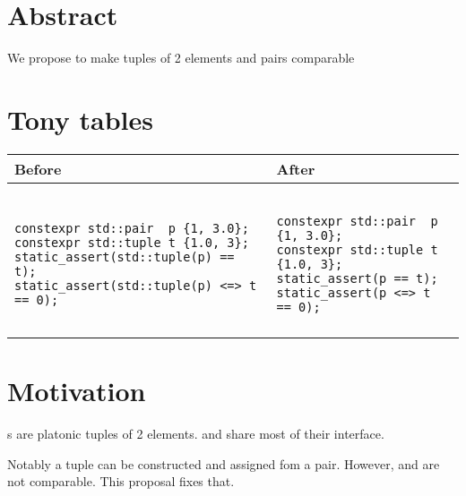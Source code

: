 \documentclass{wg21}
\title{\tcode{Comparing pairs and tuples}}
\author{Corentin Jabot}{corentin.jabot@gmail.com}
\begin{document}
\maketitle


\section{Abstract}

We propose to make tuples of 2 elements and pairs comparable

\section{Tony tables}
\begin{center}
\begin{tabular}{l|l}
Before & After\\ \hline

\begin{minipage}[t]{0.5\textwidth}
\begin{lstlisting}[style=color]

constexpr std::pair  p {1, 3.0};
constexpr std::tuple t {1.0, 3};
static_assert(std::tuple(p) == t);
static_assert(std::tuple(p) <=> t == 0);

\end{lstlisting}
\end{minipage}
&
\begin{minipage}[t]{0.5\textwidth}
\begin{lstlisting}[style=color]

constexpr std::pair  p {1, 3.0};
constexpr std::tuple t {1.0, 3};
static_assert(p == t);
static_assert(p <=> t == 0);

\end{lstlisting}
\end{minipage}
\\\\ \hline

\end{tabular}
\end{center}

\section{Motivation}

s are platonic tuples of 2 elements.  and  share
most of their interface.

Notably a tuple can be constructed and assigned fom a pair.
However,  and  are not comparable.
This proposal fixes that.
\end{document}
